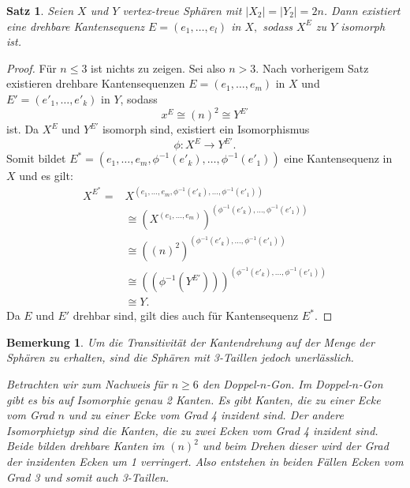 \documentclass[12pt,titlepage,twoside,cleardoublepage]{article}
\theoremstyle{nummermitklammern}
\newtheorem{bemerkung}[temp]{Bemerkung}
\newtheorem{satz}[temp]{Satz}
\newtheorem{bemerkung}[zahl]{Bemerkung}
\newtheorem{satz}[zahl]{Satz}
\numberwithin{equation}{section}
\begin{document}
\begin{satz} \label{kantendrehung}
Seien $X$ und $Y$ vertex-treue Sphären mit $\vert X_2\vert=\vert Y_2\vert=2n$.
Dann existiert eine drehbare Kantensequenz $E=(e_1,\ldots,e_l)$ in $X,$ sodass  $X^E$ zu $Y$ isomorph ist. 
\end{satz}
\begin{proof}
Für $n\leq 3$ ist nichts zu zeigen. Sei also $n>3$. Nach vorherigem Satz existieren drehbare Kantensequenzen $E=(e_1,\ldots,e_m)$ in $X$ und $E'=(e'_1,\ldots,e'_{k})$ in $Y$, sodass 
\[
x^E\cong (n)^2 \cong Y^{E'}
\] ist.
Da $X^E$ und $Y^{E'}$ isomorph sind, existiert ein Isomorphismus 
\[
\phi: X^E\to Y^{E'}.
\]
Somit bildet $E^*=(e_1,\ldots,e_m,\phi^{-1}(e'_{k}),\ldots,\phi^{-1}(e'_{1}))$ eine Kantensequenz in $X$ und es gilt:
\begin{align*}
X^{E^{*}} = &X^{(e_1,\ldots,e_m,\phi^{-1}(e'_{k}),\ldots,\phi^{-1}(e'_{1}))}\\
&\cong (X^{(e_1,\ldots,e_m)})^{(\phi^{-1}(e'_{k}),\ldots,\phi^{-1}(e'_{1}))}\\
&\cong ((n)^2)^{(\phi^{-1}(e'_{k}),\ldots,\phi^{-1}(e'_{1}))}\\
&\cong ((\phi^{-1}(Y^{E'})))^{(\phi^{-1}(e'_{k}),\ldots,\phi^{-1}(e'_{1}))}\\
&\cong Y .
\end{align*}
Da $E$ und $E'$ drehbar sind, gilt dies auch für Kantensequenz $E^*.$
\end{proof}
\begin{bemerkung}
 Um die Transitivität der Kantendrehung auf der Menge der Sphären zu erhalten, sind die Sphären mit 3-Taillen jedoch unerlässlich.

 Betrachten wir zum Nachweis für $n\geq 6$ den Doppel-$n$-Gon. Im Doppel-$n$-Gon gibt es bis auf Isomorphie genau 2 Kanten. Es gibt Kanten, die zu einer Ecke vom Grad $n$ und zu einer Ecke vom Grad 4 inzident sind. Der andere Isomorphietyp sind die Kanten, die zu zwei Ecken vom Grad 4 inzident sind. Beide bilden drehbare Kanten im $(n)^2$ und beim Drehen dieser wird der Grad der inzidenten Ecken um 1 verringert. Also entstehen in beiden Fällen Ecken vom Grad 3 und somit auch 3-Taillen.
\end{bemerkung}
\end{document}
